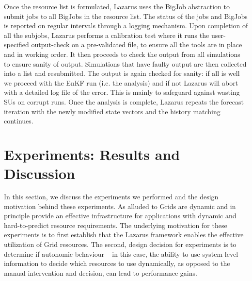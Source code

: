 \documentclass{sig-alternate}
\begin{document}
Once the resource list is formulated, Lazarus uses the BigJob
abstraction to submit jobs to all BigJobs in the resource list. The
status of the jobs and BigJobs is reported on regular intervals
through a logging mechanism. Upon completion of all the subjobs,
Lazarus performs a calibration test where it runs the user-specified
output-check on a pre-validated file, to ensure all the tools are in
place and in working order. It then proceeds to check the output from
all simulations to ensure sanity of output. Simulations that have
faulty output are then collected into a list and resubmitted. The
output is again checked for sanity: if all is well we proceed with the
EnKF run (i.e. the analysis) and if not Lazarus will abort with a
detailed log file of the error. This is mainly to safeguard against
wasting SUs on corrupt runs. Once the analysis is complete, Lazarus
repeats the forecast iteration with the newly modified state vectors
and the history matching continues.


\section{Experiments: Results and Discussion}

In this section, we discuss the experiments we performed and the
design motivation behind these experiments.  As alluded to Grids are
dynamic and in principle provide an effective infrastructure for
applications with dynamic and hard-to-predict resource requirements.
The underlying motivation for these experiments is to first establish
that the Lazarus framework enables the effective utilization of Grid
resources. The second, design decision for experiments is to determine
if autonomic behaviour -- in this case, the ability to use
system-level information to decide which resources to use dynamically,
as opposed to the manual intervention and decision, can lead to
performance gains.
\end{document}
